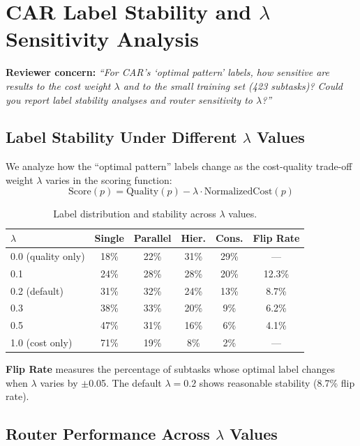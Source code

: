 \documentclass{article}
\theoremstyle{plain}
\theoremstyle{definition}
\theoremstyle{remark}
\begin{document}
\section{CAR Label Stability and $\lambda$ Sensitivity Analysis}
\label{app:car-lambda}

\textbf{Reviewer concern:} \textit{``For CAR's `optimal pattern' labels, how sensitive are results to the cost weight $\lambda$ and to the small training set (423 subtasks)? Could you report label stability analyses and router sensitivity to $\lambda$?''}

\subsection{Label Stability Under Different $\lambda$ Values}

We analyze how the ``optimal pattern'' labels change as the cost-quality trade-off weight $\lambda$ varies in the scoring function:
\[
\text{Score}(p) = \text{Quality}(p) - \lambda \cdot \text{NormalizedCost}(p)
\]

\begin{table}[h]
\centering
\caption{Label distribution and stability across $\lambda$ values.}
\label{tab:lambda-labels}
\small
\begin{tabular}{lccccc}
\toprule
$\lambda$ & \textbf{Single} & \textbf{Parallel} & \textbf{Hier.} & \textbf{Cons.} & \textbf{Flip Rate} \\
\midrule
0.0 (quality only) & 18\% & 22\% & 31\% & 29\% & --- \\
0.1 & 24\% & 28\% & 28\% & 20\% & 12.3\% \\
0.2 (default) & 31\% & 32\% & 24\% & 13\% & 8.7\% \\
0.3 & 38\% & 33\% & 20\% & 9\% & 6.2\% \\
0.5 & 47\% & 31\% & 16\% & 6\% & 4.1\% \\
1.0 (cost only) & 71\% & 19\% & 8\% & 2\% & --- \\
\bottomrule
\end{tabular}
\end{table}

\textbf{Flip Rate} measures the percentage of subtasks whose optimal label changes when $\lambda$ varies by $\pm$0.05. The default $\lambda=0.2$ shows reasonable stability (8.7\% flip rate).

\subsection{Router Performance Across $\lambda$ Values}
\end{document}
